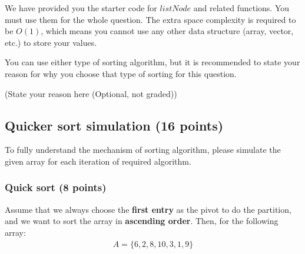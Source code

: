 \documentclass[11pt]{exam}
\begin{document}
We have provided you the starter code for $listNode$ and related functions. You must use them for the whole question. The extra space complexity is required to be $O(1)$, which means you cannot use any other data structure (array, vector, etc.) to store your values.

You can use either type of sorting algorithm, but it is recommended to state your reason for why you choose that type of sorting for this question.

\begin{solution}
(State your reason here (Optional, not graded))
\end{solution}


\subsection{Quicker sort simulation (16 points)}
To fully understand the mechanism of sorting algorithm, please simulate the given array for each iteration of required algorithm.

\subsubsection{Quick sort (8 points)}

Assume that we always choose the \textbf{first entry} as the pivot to do the partition, and we want to sort the array in \textbf{ascending order}. Then, for the following array:
\begin{align*}
A = \{6, 2, 8, 10, 3, 1, 9\}
\end{align*}
\end{document}
